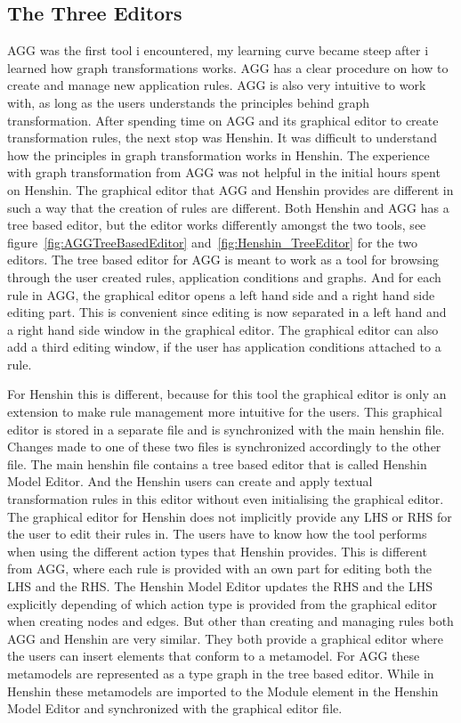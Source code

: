 \documentclass[pdftex,11pt,a4paper]{article}
\begin{document}
\subsection{The Three Editors}
AGG was the first tool i encountered, my learning curve became steep after i
learned how graph transformations works. AGG has a clear procedure on how to create and
manage new application rules. AGG is also very intuitive to work with, as long
as the users understands the principles behind graph transformation.
After spending time on AGG and its graphical editor to create transformation rules, the next
stop was Henshin. It was difficult to understand how the principles in graph
transformation works in Henshin. The experience with graph transformation from
AGG was not helpful in the initial hours spent on Henshin. The graphical editor
that AGG and Henshin provides are different in such a way that the creation of
rules are different. Both Henshin and AGG has a tree based editor, but the
editor works differently amongst the two tools, see
figure~\ref{fig:AGGTreeBasedEditor} and~\ref{fig:Henshin_TreeEditor} for the
two editors. The tree based editor for AGG is meant to work as a tool for
browsing through the user created rules, application conditions and graphs. And
for each rule in AGG, the graphical editor opens a left hand side and a right
hand side editing part. This is convenient since editing is now separated in a
left hand and a right hand side window in the graphical editor. The graphical editor can also
add a third editing window, if the user has application conditions attached to a
rule. 

For Henshin this is different, because for this tool the graphical editor
is only an extension to make rule management more intuitive for the users. This
graphical editor is stored in a separate file and is synchronized with the main
henshin file. Changes made to one of these two files is synchronized
accordingly to the other file. The main henshin file contains a tree based
editor that is called Henshin Model Editor. And the Henshin users can create and
apply textual transformation rules in this editor without even initialising the
graphical editor. The graphical editor for Henshin does not implicitly provide
any LHS or RHS for the user to edit their rules in. The users have to know how the tool
performs when using the different action types that Henshin provides. This is
different from AGG, where each rule is provided with an own part for editing
both the LHS and the RHS. The Henshin Model Editor updates the RHS and the LHS
explicitly depending of which action type is provided from the graphical
editor when creating nodes and edges. But other than creating and managing
rules both AGG and Henshin are very similar. They both provide a graphical editor where
the users can insert elements that conform to a metamodel. For AGG these
metamodels are represented as a type graph in the tree based editor. While in
Henshin these metamodels are imported to the Module element in the Henshin Model
Editor and synchronized with the graphical editor file.
\end{document}
